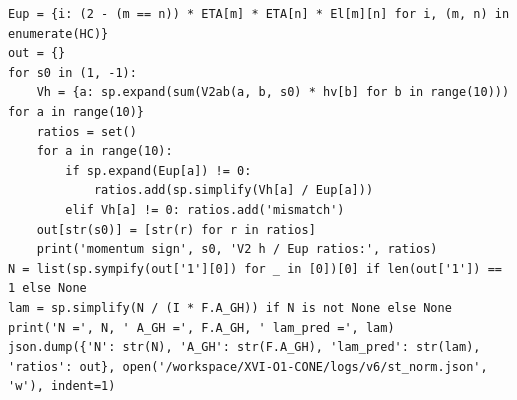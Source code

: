 \documentclass[10pt]{article}
\begin{document}
\begin{lstlisting}
Eup = {i: (2 - (m == n)) * ETA[m] * ETA[n] * El[m][n] for i, (m, n) in enumerate(HC)}
out = {}
for s0 in (1, -1):
    Vh = {a: sp.expand(sum(V2ab(a, b, s0) * hv[b] for b in range(10))) for a in range(10)}
    ratios = set()
    for a in range(10):
        if sp.expand(Eup[a]) != 0:
            ratios.add(sp.simplify(Vh[a] / Eup[a]))
        elif Vh[a] != 0: ratios.add('mismatch')
    out[str(s0)] = [str(r) for r in ratios]
    print('momentum sign', s0, 'V2 h / Eup ratios:', ratios)
N = list(sp.sympify(out['1'][0]) for _ in [0])[0] if len(out['1']) == 1 else None
lam = sp.simplify(N / (I * F.A_GH)) if N is not None else None
print('N =', N, ' A_GH =', F.A_GH, ' lam_pred =', lam)
json.dump({'N': str(N), 'A_GH': str(F.A_GH), 'lam_pred': str(lam), 'ratios': out}, open('/workspace/XVI-O1-CONE/logs/v6/st_norm.json', 'w'), indent=1)
\end{lstlisting}
\end{document}
